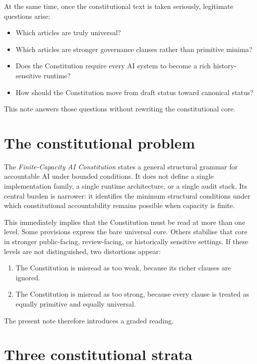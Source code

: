 \documentclass[11pt]{article}
\begin{document}
At the same time, once the constitutional text is taken seriously, legitimate questions arise:
\begin{itemize}[leftmargin=2em]
    \item Which articles are truly universal?
    \item Which articles are stronger governance clauses rather than primitive minima?
    \item Does the Constitution require every AI system to become a rich history-sensitive runtime?
    \item How should the Constitution move from draft status toward canonical status?
\end{itemize}

This note answers those questions without rewriting the constitutional core.

\section{The constitutional problem}

The \emph{Finite-Capacity AI Constitution} states a general structural grammar for accountable AI under bounded conditions. It does not define a single implementation family, a single runtime architecture, or a single audit stack. Its central burden is narrower: it identifies the minimum structural conditions under which constitutional accountability remains possible when capacity is finite.

This immediately implies that the Constitution must be read at more than one level. Some provisions express the bare universal core. Others stabilise that core in stronger public-facing, review-facing, or historically sensitive settings. If these levels are not distinguished, two distortions appear:
\begin{enumerate}[leftmargin=2em,label=\arabic*.]
    \item The Constitution is misread as too weak, because its richer clauses are ignored.
    \item The Constitution is misread as too strong, because every clause is treated as equally primitive and equally universal.
\end{enumerate}

The present note therefore introduces a graded reading.

\section{Three constitutional strata}
\end{document}
